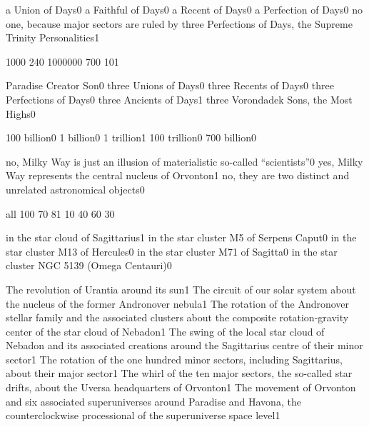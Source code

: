{a Union of Days}{0}
{a Faithful of Days}{0}
{a Recent of Days}{0}
{a Perfection of Days}{0}
{no one, because major sectors are ruled by three Perfections of Days, the Supreme Trinity Personalities}{1}
\qstop

{100}{0}
{24}{0}
{100000}{0}
{70}{0}
{10}{1}
\qstop

{Paradise Creator Son}{0}
{three Unions of Days}{0}
{three Recents of Days}{0}
{three Perfections of Days}{0}
{three Ancients of Days}{1}
{three Vorondadek Sons, the Most Highs}{0}
\qstop

{100 billion}{0}
{1 billion}{0}
{1 trillion}{1}
{100 trillion}{0}
{700 billion}{0}
\qstop

{no, Milky Way is just an illusion of materialistic so-called ``scientists''}{0}
{yes, Milky Way represents the central nucleus of Orvonton}{1}
{no, they are two distinct and unrelated astronomical objects}{0}
\qstop

{all 10}{0}
{7}{0}
{8}{1}
{1}{0}
{4}{0}
{6}{0}
{3}{0}
\qstop

{in the star cloud of Sagittarius}{1}
{in the star cluster M5 of Serpens Caput}{0}
{in the star cluster M13 of Hercules}{0}
{in the star cluster M71 of Sagitta}{0}
{in the star cluster NGC 5139 (Omega Centauri)}{0}
\qstop

{The revolution of Urantia around its sun}{1}
{The circuit of our solar system about the nucleus of the former Andronover nebula}{1}
{The rotation of the Andronover stellar family and the associated clusters about the composite rotation-gravity center of the star cloud of Nebadon}{1}
{The swing of the local star cloud of Nebadon and its associated creations around the Sagittarius centre of their minor sector}{1}
{The rotation of the one hundred minor sectors, including Sagittarius, about their major sector}{1}
{The whirl of the ten major sectors, the so-called star drifts, about the Uversa headquarters of Orvonton}{1}
{The movement of Orvonton and six associated superuniverses around Paradise and Havona, the counterclockwise processional of the superuniverse space level}{1}
\qstop


